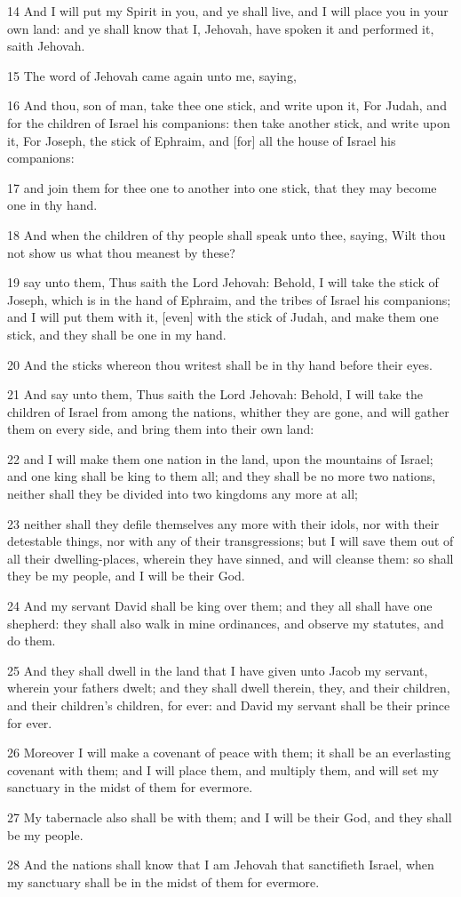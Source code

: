 \par 14 And I will put my Spirit in you, and ye shall live, and I will place you in your own land: and ye shall know that I, Jehovah, have spoken it and performed it, saith Jehovah.
\par 15 The word of Jehovah came again unto me, saying,
\par 16 And thou, son of man, take thee one stick, and write upon it, For Judah, and for the children of Israel his companions: then take another stick, and write upon it, For Joseph, the stick of Ephraim, and [for] all the house of Israel his companions:
\par 17 and join them for thee one to another into one stick, that they may become one in thy hand.
\par 18 And when the children of thy people shall speak unto thee, saying, Wilt thou not show us what thou meanest by these?
\par 19 say unto them, Thus saith the Lord Jehovah: Behold, I will take the stick of Joseph, which is in the hand of Ephraim, and the tribes of Israel his companions; and I will put them with it, [even] with the stick of Judah, and make them one stick, and they shall be one in my hand.
\par 20 And the sticks whereon thou writest shall be in thy hand before their eyes.
\par 21 And say unto them, Thus saith the Lord Jehovah: Behold, I will take the children of Israel from among the nations, whither they are gone, and will gather them on every side, and bring them into their own land:
\par 22 and I will make them one nation in the land, upon the mountains of Israel; and one king shall be king to them all; and they shall be no more two nations, neither shall they be divided into two kingdoms any more at all;
\par 23 neither shall they defile themselves any more with their idols, nor with their detestable things, nor with any of their transgressions; but I will save them out of all their dwelling-places, wherein they have sinned, and will cleanse them: so shall they be my people, and I will be their God.
\par 24 And my servant David shall be king over them; and they all shall have one shepherd: they shall also walk in mine ordinances, and observe my statutes, and do them.
\par 25 And they shall dwell in the land that I have given unto Jacob my servant, wherein your fathers dwelt; and they shall dwell therein, they, and their children, and their children's children, for ever: and David my servant shall be their prince for ever.
\par 26 Moreover I will make a covenant of peace with them; it shall be an everlasting covenant with them; and I will place them, and multiply them, and will set my sanctuary in the midst of them for evermore.
\par 27 My tabernacle also shall be with them; and I will be their God, and they shall be my people.
\par 28 And the nations shall know that I am Jehovah that sanctifieth Israel, when my sanctuary shall be in the midst of them for evermore.


